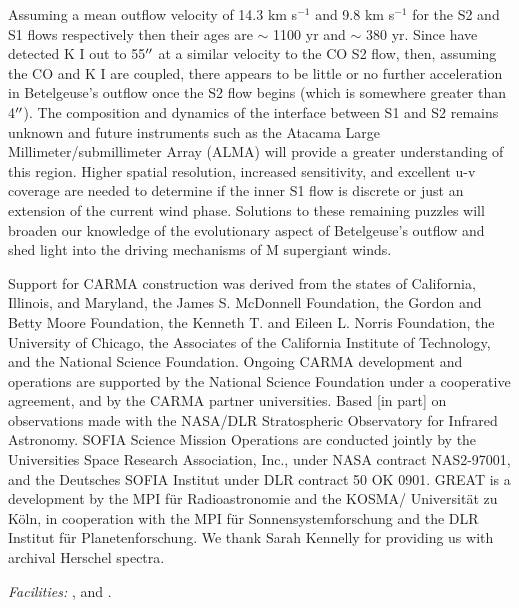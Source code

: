 \documentclass[iop]{emulateapj}
\begin{document}
Assuming a mean outflow velocity of 14.3 km s${}^{-1}$ and 9.8 km s${}^{-1}$ for the S2 and S1 flows respectively then their ages are $\sim$ 1100 yr and $\sim$ 380 yr. Since \cite{2002A&A...386.1009P} have detected K I out to 55$\mbox{$^{\prime\prime}$}$ at a similar velocity to the CO S2 flow, then, assuming the CO and K I are coupled, there appears to be little or no further acceleration in Betelgeuse's outflow once the S2 flow begins (which is somewhere greater than 4$\mbox{$^{\prime\prime}$}$). The composition and dynamics of the interface between S1 and S2 remains unknown and future instruments such as the Atacama Large Millimeter/submillimeter Array (ALMA) will provide a greater understanding of this region. Higher spatial resolution, increased sensitivity, and excellent u-v coverage are needed to determine if the inner S1 flow is discrete or just an extension of the current wind phase. Solutions to these remaining puzzles will broaden our knowledge of the evolutionary aspect of Betelgeuse's outflow and shed light into the driving mechanisms of M supergiant winds.

\acknowledgments

Support for CARMA construction was derived from the states of California, Illinois, and
Maryland, the James S. McDonnell Foundation, the Gordon and Betty Moore Foundation, the
Kenneth T. and Eileen L. Norris Foundation, the University of Chicago, the Associates of the
California Institute of Technology, and the National Science Foundation. Ongoing CARMA
development and operations are supported by the National Science Foundation under a
cooperative agreement, and by the CARMA partner universities. Based [in part] on observations made with the NASA/DLR Stratospheric Observatory for Infrared Astronomy. SOFIA Science Mission Operations are conducted jointly by the Universities Space Research Association, Inc., under NASA contract NAS2-97001, and the Deutsches SOFIA Institut under DLR contract 50 OK 0901. GREAT is a development by the MPI für Radioastronomie and the KOSMA/ Universität zu Köln, in cooperation with the MPI für Sonnensystemforschung and the DLR Institut für Planetenforschung. We thank Sarah Kennelly for providing us with archival Herschel spectra.

{\it Facilities:} ,  and .



\appendix
\end{document}

